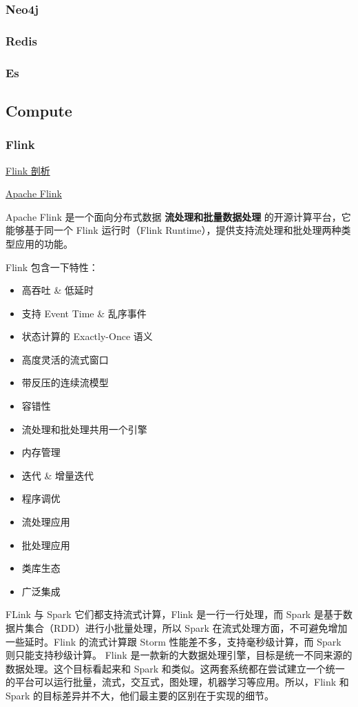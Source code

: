 \documentclass[hyperref, UTF-8]{ctexart}
\begin{document}
\subsubsection{Neo4j}
\label{sec:org5f8296c}
\subsubsection{Redis}
\label{sec:org0e50a15}
\subsubsection{Es}
\label{sec:org3f90fa7}
\subsection{Compute}
\label{sec:org258d79f}
\subsubsection{Flink}
\label{sec:org9e0cef4}
\href{http://www.cnblogs.com/smartloli/p/5580757.html}{Flink 剖析}

\href{https://flink.apache.org}{Apache Flink}

Apache Flink 是一个面向分布式数据 \textbf{流处理和批量数据处理} 的开源计算平台，它能够基于同一个 Flink 运行时（Flink Runtime），提供支持流处理和批处理两种类型应用的功能。  

Flink 包含一下特性：
\begin{itemize}
\item 高吞吐 \& 低延时
\item 支持 Event Time \& 乱序事件
\item 状态计算的 Exactly-Once 语义
\item 高度灵活的流式窗口
\item 带反压的连续流模型
\item 容错性
\item 流处理和批处理共用一个引擎
\item 内存管理
\item 迭代 \& 增量迭代
\item 程序调优
\item 流处理应用
\item 批处理应用
\item 类库生态
\item 广泛集成
\end{itemize}
FLink 与 Spark 它们都支持流式计算，Flink 是一行一行处理，而 Spark 是基于数据片集合（RDD）进行小批量处理，所以 Spark 在流式处理方面，不可避免增加一些延时。Flink 的流式计算跟 Storm 性能差不多，支持毫秒级计算，而 Spark 则只能支持秒级计算。
Flink 是一款新的大数据处理引擎，目标是统一不同来源的数据处理。这个目标看起来和 Spark 和类似。这两套系统都在尝试建立一个统一的平台可以运行批量，流式，交互式，图处理，机器学习等应用。所以，Flink 和 Spark 的目标差异并不大，他们最主要的区别在于实现的细节。
\end{document}
